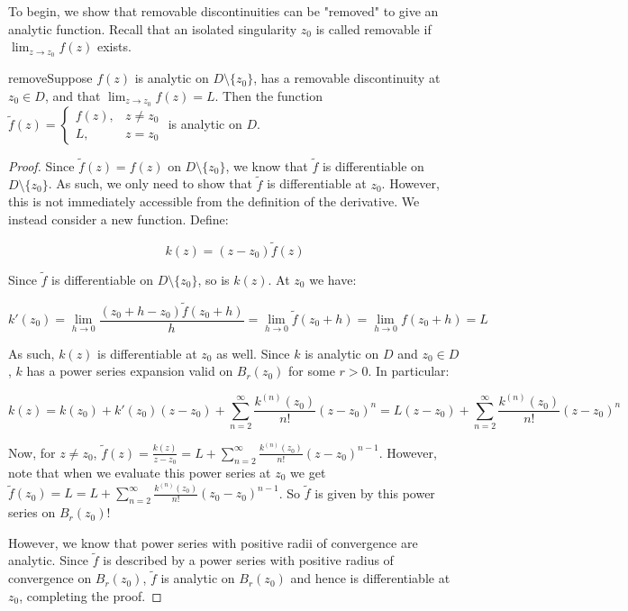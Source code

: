 To begin, we show that removable discontinuities can be "removed" to give an analytic function. Recall that an isolated singularity $z_0$ is called removable if $\lim_{z\rightarrow z_0} f(z)$ exists.

\begin{thmbo}{}{remove}Suppose $f(z)$ is analytic on $D\setminus \{z_0\}$, has a removable discontinuity at $z_0\in D$, and that $\lim_{z\rightarrow z_0} f(z) = L$. Then the function $\tilde{f}(z) = \begin{cases} f(z), & z\ne z_0\\ L, & z= z_0\end{cases}$ is analytic on $D$.
\end{thmbo}

\begin{proof} Since $\tilde{f}(z) = f(z)$ on $D\setminus\{z_0\}$, we know that $\tilde{f}$ is differentiable on $D\setminus\{z_0\}$. As such, we only need to show that $\tilde{f}$ is differentiable at $z_0$. However, this is not immediately accessible from the definition of the derivative. We instead consider a new function. Define:

$$k(z) = (z-z_0)\tilde{f}(z)$$

Since $\tilde{f}$ is differentiable on $D\setminus\{z_0\}$, so is $k(z)$. At $z_0$ we have:

$$k'(z_0) = \lim_{h\rightarrow 0} \frac{(z_0 + h - z_0)\tilde{f}(z_0 + h)}{h}= \lim_{h\rightarrow 0}\tilde{f}(z_0 + h) = \lim_{h\rightarrow 0}f(z_0 + h) = L$$

As such, $k(z)$ is differentiable at $z_0$ as well. Since $k$ is analytic on $D$ and $z_0\in D$, $k$ has a power series expansion valid on $B_r(z_0)$ for some $r > 0$. In particular:

$$k(z) = k(z_0) + k'(z_0)(z-z_0) + \sum_{n = 2}^\infty \frac{k^{(n)}(z_0)}{n!}(z-z_0)^n = L(z-z_0) + \sum_{n = 2}^\infty \frac{k^{(n)}(z_0)}{n!}(z-z_0)^n$$

Now, for $z\ne z_0$, $\tilde{f}(z) = \frac{k(z)}{z-z_0} = L + \sum_{n = 2}^\infty \frac{k^{(n)}(z_0)}{n!}(z-z_0)^{n-1}$. However, note that when we evaluate this power series at $z_0$ we get $\tilde{f}(z_0) = L = L + \sum_{n = 2}^\infty \frac{k^{(n)}(z_0)}{n!}(z_0-z_0)^{n-1}$. So $\tilde{f}$ is given by this power series on $B_r(z_0)$!

However, we know that power series with positive radii of convergence are analytic. Since $\tilde{f}$ is described by a power series with positive radius of convergence on $B_r(z_0)$, $\tilde{f}$ is analytic on $B_r(z_0)$ and hence is differentiable at $z_0$, completing the proof.
\end{proof}

